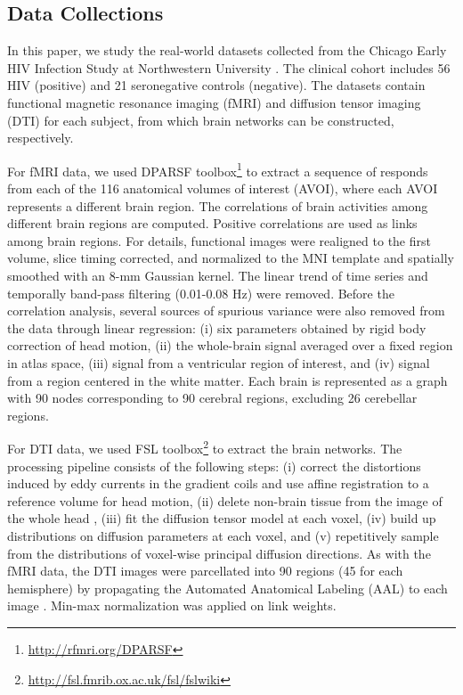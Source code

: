 \documentclass[conference]{IEEEtran}
\begin{document}
\subsection{Data Collections}\label{sec:dataset}

In this paper, we study the real-world datasets collected from the Chicago Early HIV Infection Study at Northwestern University \cite{ragin2012structural}. The clinical cohort includes 56 HIV (positive) and 21 seronegative controls (negative). The datasets contain functional magnetic resonance imaging (fMRI) and diffusion tensor imaging (DTI) for each subject, from which brain networks can be constructed, respectively.

For fMRI data, we used DPARSF toolbox\footnote{\url{http://rfmri.org/DPARSF}} to extract a sequence of responds from each of the 116 anatomical volumes of interest (AVOI), where each AVOI represents a different brain region. The correlations of brain activities among different brain regions are computed. Positive correlations are used as links among brain regions. For details, functional images were realigned to the first volume, slice timing corrected, and normalized to the MNI template and spatially smoothed with an 8-mm Gaussian kernel. The linear trend of time series and temporally band-pass filtering (0.01-0.08 Hz) were removed. Before the correlation analysis, several sources of spurious variance were also removed from the data through linear regression: (i) six parameters obtained by rigid body correction of head motion, (ii) the whole-brain signal averaged over a fixed region in atlas space, (iii) signal from a ventricular region of interest, and (iv) signal from a region centered in the white matter. Each brain is represented as a graph with 90 nodes corresponding to 90 cerebral regions, excluding 26 cerebellar regions.

For DTI data, we used FSL toolbox\footnote{\url{http://fsl.fmrib.ox.ac.uk/fsl/fslwiki}} to extract the brain networks. The processing pipeline consists of the following steps: (i) correct the distortions induced by eddy currents in the gradient coils and use affine registration to a reference volume for head motion, (ii) delete non-brain tissue from the image of the whole head \cite{smith2002fast,jenkinson2005bet2}, (iii) fit the diffusion tensor model at each voxel, (iv) build up distributions on diffusion parameters at each voxel, and (v) repetitively sample from the distributions of voxel-wise principal diffusion directions. As with the fMRI data, the DTI images were parcellated into 90 regions (45 for each hemisphere) by propagating the Automated Anatomical Labeling (AAL) to each image \cite{tzourio2002automated}. Min-max normalization was applied on link weights.
\end{document}
